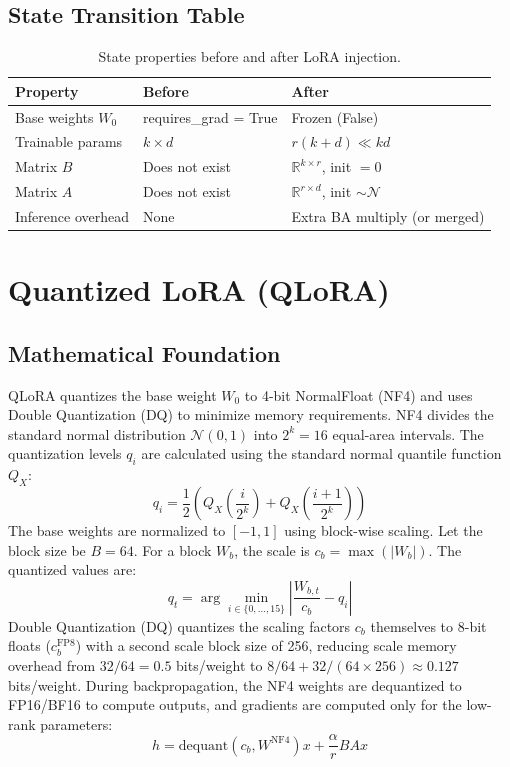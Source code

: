 \documentclass{article}
\begin{document}
\subsection{State Transition Table}
\begin{table}[h]\centering
\begin{tabular}{lll}\toprule
\textbf{Property} & \textbf{Before} & \textbf{After}\\\midrule
Base weights $W_0$ & requires\_grad = True & Frozen (False)\\
Trainable params & $k \times d$ & $r(k+d) \ll kd$\\
Matrix $B$ & Does not exist & $\mathbb{R}^{k\times r}$, init $= 0$\\
Matrix $A$ & Does not exist & $\mathbb{R}^{r\times d}$, init $\sim \mathcal{N}$\\
Inference overhead & None & Extra BA multiply (or merged)\\\bottomrule
\end{tabular}
\caption{State properties before and after LoRA injection.}
\end{table}

\newpage
\section{Quantized LoRA (QLoRA)}

\subsection{Mathematical Foundation}
QLoRA quantizes the base weight $W_0$ to 4-bit NormalFloat (NF4) and uses Double Quantization (DQ) to minimize memory requirements.
NF4 divides the standard normal distribution $\mathcal{N}(0, 1)$ into $2^k=16$ equal-area intervals. The quantization levels $q_i$ are calculated using the standard normal quantile function $Q_X$:
\begin{equation}
  q_i = \frac{1}{2} \left( Q_X\left(\frac{i}{2^k}\right) + Q_X\left(\frac{i+1}{2^k}\right) \right)
\end{equation}
The base weights are normalized to $[-1, 1]$ using block-wise scaling. Let the block size be $B=64$. For a block $W_b$, the scale is $c_b = \max(|W_b|)$. The quantized values are:
\begin{equation}
  q_t = \arg\min_{i \in \{0, \dots, 15\}} \left| \frac{W_{b,t}}{c_b} - q_i \right|
\end{equation}
Double Quantization (DQ) quantizes the scaling factors $c_b$ themselves to 8-bit floats ($c_b^{\text{FP8}}$) with a second scale block size of 256, reducing scale memory overhead from $32/64 = 0.5$ bits/weight to $8/64 + 32/(64 \times 256) \approx 0.127$ bits/weight.
During backpropagation, the NF4 weights are dequantized to FP16/BF16 to compute outputs, and gradients are computed only for the low-rank parameters:
\begin{equation}
  h = \text{dequant}(c_b, W^{\text{NF4}}) x + \frac{\alpha}{r} B A x
\end{equation}
\end{document}

